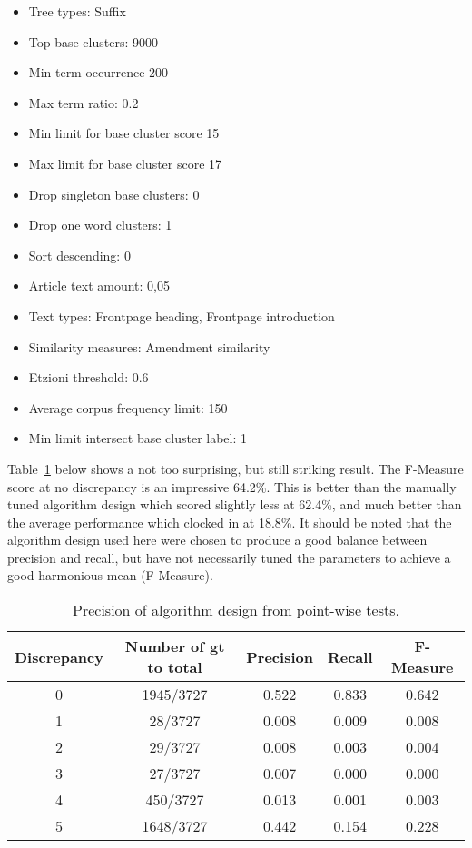 \begin{itemize}
  \item Tree types: Suffix
  \item Top base clusters: 9000
  \item Min term occurrence 200
  \item Max term ratio: 0.2
  \item Min limit for base cluster score 15
  \item Max limit for base cluster score 17
  \item Drop singleton base clusters: 0
  \item Drop one word clusters: 1
  \item Sort descending: 0
  \item Article text amount: 0,05
  \item Text types: Frontpage heading, Frontpage introduction
  \item Similarity measures: Amendment similarity
  \item Etzioni threshold: 0.6
  \item Average corpus frequency limit: 150
  \item Min limit intersect base cluster label: 1
\end{itemize}

Table~\ref{tab:incrementalparametersresults} below shows a not too surprising, but still striking result. The F-Measure score at no discrepancy is an impressive 64.2\%. This is better than the manually tuned \citeauthor{Moe2014compact} algorithm design which scored slightly less at 62.4\%, and much better than the average performance which clocked in at 18.8\%. It should be noted that the \citeauthor{Moe2014compact} algorithm design used here were chosen to produce a good balance between precision and recall, but \cite{Moe2014compact} have not necessarily tuned the parameters to achieve a good harmonious mean (F-Measure).

\begin{table}[H]
\begin{center}
\begin{tabular}{|c|c|ccc|}
\hline
Discrepancy & Number of gt to total & Precision & Recall & F-Measure\\ 
\hline
0&   1945/3727&   0.522&    0.833&    0.642\\ 
1&   28/3727&     0.008&    0.009&    0.008\\ 
2&   29/3727&     0.008&    0.003&    0.004\\ 
3&   27/3727&     0.007&    0.000&    0.000\\
4&   450/3727&    0.013&    0.001&    0.003\\ 
5&   1648/3727&   0.442&    0.154&    0.228\\ 
\hline
\end{tabular}
\end{center}
\caption{Precision of algorithm design from point-wise tests.}
\label{tab:incrementalparametersresults}
\end{table}

